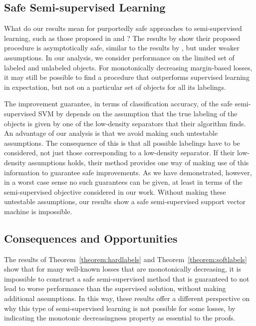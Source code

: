\documentclass[twoside]{memoir}\usepackage[]{graphicx}\usepackage{xcolor}
\begin{document}
\subsection{Safe Semi-supervised Learning}
What do our results mean for purportedly safe approaches to semi-supervised learning, such as those proposed in \citep{Li2015} and \citep{Kawakita2014a}? The results by \citet{Kawakita2014a} show their proposed procedure is asymptotically safe, similar to the results by \citet{Sokolovska2008}, but under weaker assumptions. In our analysis, we consider performance on the limited set of labeled and unlabeled objects. For monotonically decreasing margin-based losses, it may still be possible to find a procedure that outperforms supervised learning in expectation, but not on a particular set of objects for all its labelings.

The improvement guarantee, in terms of classification accuracy, of the safe semi-supervised SVM by \citet{Li2015} depends on the assumption that the true labeling of the objects is given by one of the low-density separators that their algorithm finds. An advantage of our analysis is that we avoid making such untestable assumptions. The consequence of this is that all possible labelings have to be considered, not just those corresponding to a low-density separator. If their low-density assumptions holds, their method provides one way of making use of this information to guarantee safe improvements. As we have demonstrated, however, in a worst case sense no such guarantees can be given, at least in terms of the semi-supervised objective considered in our work. Without making these untestable assumptions, our results show a safe semi-supervised support vector machine is impossible.

\subsection{Consequences and Opportunities}
The results of Theorem~\ref{theorem:hardlabels} and Theorem~\ref{theorem:softlabels} show that for many well-known losses that are monotonically decreasing, it is impossible to construct a safe semi-supervised method that is guaranteed to not lead to worse performance than the supervised solution, without making additional assumptions. In this way, these results offer a different perspective on why this type of semi-supervised learning is not possible for some losses, by indicating the monotonic decreasingness property as essential to the proofs.
\end{document}
